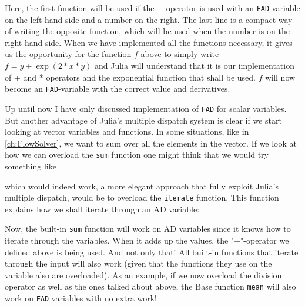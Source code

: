 
Here, the first function will be used if the + operator is used with an \texttt{FAD} variable on the left hand side and a number on the right. The last line is a compact way of writing the opposite function, which will be used when the number is on the right hand side. When we have implemented all the functions necessary, it gives us the opportunity for the function $f$ above to simply write $f = y+\exp(2*x*y)$ and Julia will understand that it is our implementation of + and * operators and the exponential function that shall be used. $f$ will now become an \texttt{FAD}-variable with the correct value and derivatives. 

Up until now I have only discussed implementation of \texttt{FAD} for scalar variables. But another advantage of Julia's multiple dispatch system is clear if we start looking at vector variables and functions. In some situations, like in \autoref{ch:FlowSolver}, we want to sum over all the elements in the vector. If we look at how we can overload the \texttt{sum} function one might think that we would try something like

which would indeed work, a more elegant approach that fully exploit Julia's multiple dispatch, would be to overload the \texttt{iterate} function. This function explains how we shall iterate through an AD variable: 

Now, the built-in \texttt{sum} function will work on AD variables since it knows how to iterate through the variables. When it adds up the values, the "+"-operator we defined above is being used. And not only that! All built-in functions that iterate through the input will also work (given that the functions they use on the variable also are overloaded). As an example, if we now overload the division operator as well as the ones talked about above, the Base function \texttt{mean} will also work on \texttt{FAD} variables with no extra work!

